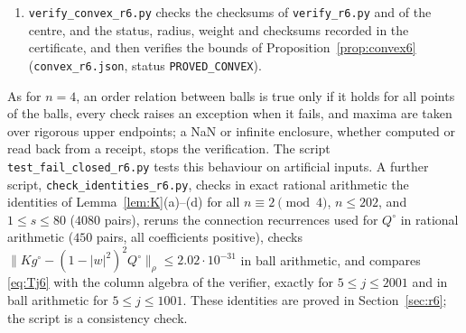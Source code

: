 \documentclass[11pt]{amsart}
\theoremstyle{definition}
\theoremstyle{remark}
\numberwithin{equation}{section}
\newcommand{\nrm}[1]{\lVert #1\rVert}
\begin{document}
{\begin{enumerate}[label=(\arabic*)]
\item \texttt{verify\_convex\_r6.py} checks the checksums of \texttt{verify\_r6.py} and of the centre, and the status, radius, weight and checksums recorded in the certificate, and then verifies the bounds of Proposition~\ref{prop:convex6} (\texttt{convex\_r6.json}, status \texttt{PROVED\_CONVEX}).
\end{enumerate}
\par}
As for $n=4$, an order relation between balls is true only if it holds for all points of the balls, every check raises an exception when it fails, and maxima are taken over rigorous upper endpoints; a NaN or infinite enclosure, whether computed or read back from a receipt, stops the verification. The script \texttt{test\_fail\_closed\_r6.py} tests this behaviour on artificial inputs. A further script, \texttt{check\_identities\_r6.py}, checks in exact rational arithmetic the identities of Lemma~\ref{lem:K}(a)--(d) for all $n\equiv2\pmod4$, $n\leq202$, and $1\leq s\leq80$ ($4080$ pairs), reruns the connection recurrences used for $Q^\circ$ in rational arithmetic ($450$ pairs, all coefficients positive), checks $\nrm{Kg^\circ-(1-|w|^2)^2Q^\circ}_\rho\leq2.02\cdot10^{-31}$ in ball arithmetic, and compares \eqref{eq:Tj6} with the column algebra of the verifier, exactly for $5\leq j\leq2001$ and in ball arithmetic for $5\leq j\leq1001$. These identities are proved in Section~\ref{sec:r6}; the script is a consistency check.
\end{document}
